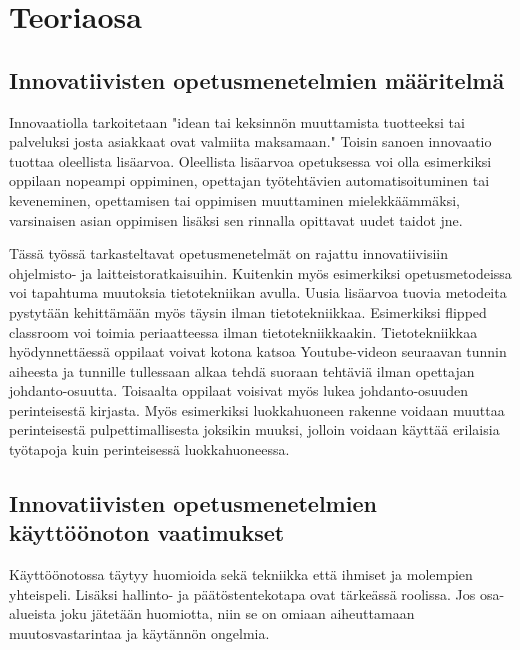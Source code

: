 \documentclass[utf8,bachelor]{gradu3}
\begin{document}




\chapter{Teoriaosa} %

\section{Innovatiivisten opetusmenetelmien määritelmä}
Innovaatiolla tarkoitetaan "idean tai keksinnön muuttamista tuotteeksi tai palveluksi josta asiakkaat ovat valmiita maksamaan." \parencite[][]{innovaatio} Toisin sanoen innovaatio tuottaa oleellista lisäarvoa. Oleellista lisäarvoa opetuksessa voi olla esimerkiksi oppilaan nopeampi oppiminen, opettajan työtehtävien automatisoituminen tai keveneminen, opettamisen tai oppimisen muuttaminen mielekkäämmäksi, varsinaisen asian oppimisen lisäksi sen rinnalla opittavat uudet taidot jne.

Tässä työssä tarkasteltavat opetusmenetelmät on rajattu innovatiivisiin ohjelmisto- ja laitteistoratkaisuihin. Kuitenkin myös esimerkiksi opetusmetodeissa voi tapahtuma muutoksia tietotekniikan avulla. Uusia lisäarvoa tuovia metodeita pystytään kehittämään myös täysin ilman tietotekniikkaa. Esimerkiksi flipped classroom voi toimia periaatteessa ilman tietotekniikkaakin. Tietotekniikkaa hyödynnettäessä oppilaat voivat kotona katsoa Youtube-videon seuraavan tunnin aiheesta ja tunnille tullessaan alkaa tehdä suoraan tehtäviä ilman opettajan johdanto-osuutta. \parencite[][]{flipped}Toisaalta oppilaat voisivat myös lukea johdanto-osuuden perinteisestä kirjasta. Myös esimerkiksi luokkahuoneen rakenne voidaan muuttaa perinteisestä pulpettimallisesta joksikin muuksi, jolloin voidaan käyttää erilaisia työtapoja kuin perinteisessä luokkahuoneessa.


\section{Innovatiivisten opetusmenetelmien käyttöönoton vaatimukset}
Käyttöönotossa täytyy huomioida sekä tekniikka että ihmiset ja molempien yhteispeli. Lisäksi hallinto- ja päätöstentekotapa ovat tärkeässä roolissa. Jos osa-alueista joku jätetään huomiotta, niin se on omiaan aiheuttamaan muutosvastarintaa ja käytännön ongelmia.
\end{document}
